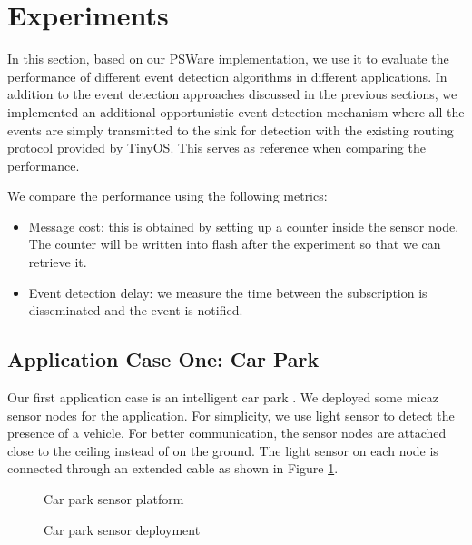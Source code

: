 \section{Experiments}
\label{sec:experiments}
In this section, based on our PSWare implementation, we use it to evaluate the performance of different event detection algorithms in different applications. In addition to the event detection approaches discussed in the previous sections, we implemented an additional opportunistic event detection mechanism where all the events are simply transmitted to the sink for detection with the existing routing protocol provided by TinyOS. This serves as reference when comparing the performance.

We compare the performance using the following metrics:
\begin{itemize}
\item Message cost: this is obtained by setting up a counter inside the sensor node. The counter will be written into flash after the experiment so that we can retrieve it.
\item Event detection delay: we measure the time between the subscription is disseminated and the event is notified.
\end{itemize}

\subsection{Application Case One: Car Park}
Our first application case is an intelligent car park \cite{tang:carpark}. We deployed some micaz sensor nodes for the application. For simplicity, we use light sensor to detect the presence of a vehicle. For better communication, the sensor nodes are attached close to the ceiling instead of on the ground. The light sensor on each node is connected through an extended cable as shown in Figure \ref{fig:carParkSensor}. 

\begin{figure}
\centering
{}
\caption{Car park sensor platform}
\label{fig:carParkSensor}
\end{figure}

\begin{figure}
\centering
{}
\caption{Car park sensor deployment}
\label{fig:carParkDeployment}
\end{figure}

